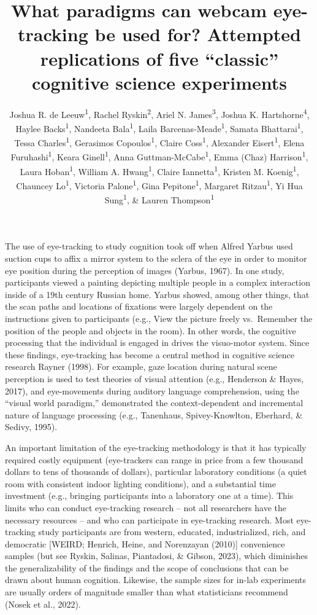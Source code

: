 \documentclass[
  man,floatsintext]{apa6}
\title{What paradigms can webcam eye-tracking be used for? Attempted replications of five ``classic'' cognitive science experiments}
\author{Joshua R. de Leeuw\textsuperscript{1}, Rachel Ryskin\textsuperscript{2}, Ariel N. James\textsuperscript{3}, Joshua K. Hartshorne\textsuperscript{4}, Haylee Backs\textsuperscript{1}, Nandeeta Bala\textsuperscript{1}, Laila Barcenas-Meade\textsuperscript{1}, Samata Bhattarai\textsuperscript{1}, Tessa Charles\textsuperscript{1}, Gerasimos Copoulos\textsuperscript{1}, Claire Coss\textsuperscript{1}, Alexander Eisert\textsuperscript{1}, Elena Furuhashi\textsuperscript{1}, Keara Ginell\textsuperscript{1}, Anna Guttman-McCabe\textsuperscript{1}, Emma (Chaz) Harrison\textsuperscript{1}, Laura Hoban\textsuperscript{1}, William A. Hwang\textsuperscript{1}, Claire Iannetta\textsuperscript{1}, Kristen M. Koenig\textsuperscript{1}, Chauncey Lo\textsuperscript{1}, Victoria Palone\textsuperscript{1}, Gina Pepitone\textsuperscript{1}, Margaret Ritzau\textsuperscript{1}, Yi Hua Sung\textsuperscript{1}, \& Lauren Thompson\textsuperscript{1}}
\date{}
\affiliation{\vspace{0.5cm}\textsuperscript{1} Cognitive Science Department, Vassar College\\\textsuperscript{2} Department of Cognitive \& Information Science, University of California, Merced\\\textsuperscript{3} Psychology Department, Macalester College\\\textsuperscript{4} Department of Psychology \& Neuroscience, Boston College}
\begin{document}
\maketitle

The use of eye-tracking to study cognition took off when Alfred Yarbus used suction cups to affix a mirror system to the sclera of the eye in order to monitor eye position during the perception of images (Yarbus, 1967). In one study, participants viewed a painting depicting multiple people in a complex interaction inside of a 19th century Russian home. Yarbus showed, among other things, that the scan paths and locations of fixations were largely dependent on the instructions given to participants (e.g., View the picture freely vs.~Remember the position of the people and objects in the room). In other words, the cognitive processing that the individual is engaged in drives the visuo-motor system. Since these findings, eye-tracking has become a central method in cognitive science research Rayner (1998). For example, gaze location during natural scene perception is used to test theories of visual attention (e.g., Henderson \& Hayes, 2017), and eye-movements during auditory language comprehension, using the ``visual world paradigm,'' demonstrated the context-dependent and incremental nature of language processing (e.g., Tanenhaus, Spivey-Knowlton, Eberhard, \& Sedivy, 1995).

An important limitation of the eye-tracking methodology is that it has typically required costly equipment (eye-trackers can range in price from a few thousand dollars to tens of thousands of dollars), particular laboratory conditions (a quiet room with consistent indoor lighting conditions), and a substantial time investment (e.g., bringing participants into a laboratory one at a time). This limits who can conduct eye-tracking research -- not all researchers have the necessary resources -- and who can participate in eye-tracking research. Most eye-tracking study participants are from western, educated, industrialized, rich, and democratic {[}WEIRD; Henrich, Heine, and Norenzayan (2010){]} convenience samples (but see Ryskin, Salinas, Piantadosi, \& Gibson, 2023), which diminishes the generalizability of the findings and the scope of conclusions that can be drawn about human cognition. Likewise, the sample sizes for in-lab experiments are usually orders of magnitude smaller than what statisticians recommend (Nosek et al., 2022).
\end{document}
